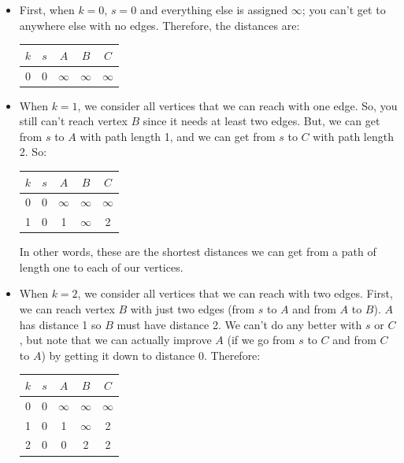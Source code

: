 \documentclass[letterpaper]{article}
\begin{document}
\begin{mdframed}[]
    \begin{itemize}
        \item First, when $k = 0$, $s = 0$ and everything else is assigned $\infty$; you can't get to anywhere else with no edges. Therefore, the distances are: 
        \begin{center}
            \begin{tabular}{c|c c c c}
                $k$ & $s$   & $A$       & $B$       & $C$ \\ 
                \hline 
                0   & 0     & $\infty$  & $\infty$  & $\infty$
            \end{tabular}
        \end{center}

        \item When $k = 1$, we consider all vertices that we can reach with one edge. So, you still can't reach vertex $B$ since it needs at least two edges. But, we can get from $s$ to $A$ with path length 1, and we can get from $s$ to $C$ with path length 2. So: 
        \begin{center}
            \begin{tabular}{c|c c c c}
                $k$ & $s$   & $A$       & $B$       & $C$ \\ 
                \hline 
                0   & 0     & $\infty$  & $\infty$  & $\infty$ \\ 
                1   & 0     & 1         & $\infty$  & 2
            \end{tabular}
        \end{center}
        In other words, these are the shortest distances we can get from a path of length one to each of our vertices. 

        \item When $k = 2$, we consider all vertices that we can reach with two edges. First, we can reach vertex $B$ with just two edges (from $s$ to $A$ and from $A$ to $B$). $A$ has distance 1 so $B$ must have distance 2. We can't do any better with $s$ or $C$, but note that we can actually improve $A$ (if we go from $s$ to $C$ and from $C$ to $A$) by getting it down to distance 0. Therefore: 
        \begin{center}
            \begin{tabular}{c|c c c c}
                $k$ & $s$   & $A$       & $B$       & $C$ \\ 
                \hline 
                0   & 0     & $\infty$  & $\infty$  & $\infty$ \\ 
                1   & 0     & 1         & $\infty$  & 2 \\ 
                2   & 0     & 0         & 2         & 2
            \end{tabular}
        \end{center}


\end{itemize}
\end{mdframed}
\end{document}
